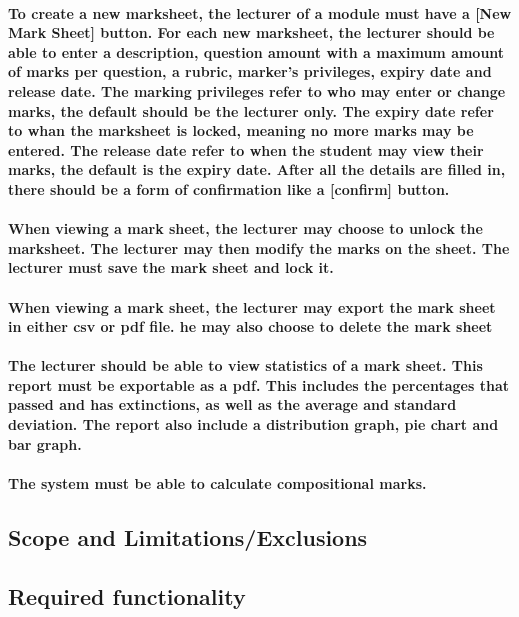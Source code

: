 \documentclass[12pt]{article}
\begin{document}
  \paragraph*{To create a new marksheet, the lecturer of a module must have a [New Mark Sheet] button. For each new marksheet, the lecturer should be able to enter a description, question amount with a maximum amount of marks per question, a rubric, marker's privileges, expiry date and release date. The marking privileges refer to who may enter or change marks, the default should be the lecturer only. The expiry date refer to whan the marksheet is locked, meaning no more marks may be entered. The release date refer to when the student may view their marks, the default is the expiry date. After all the details are filled in, there should be a form of confirmation like a [confirm] button.}
  \paragraph*{When viewing a mark sheet, the lecturer may choose to unlock the marksheet. The lecturer may then modify the marks on the sheet. The lecturer must save the mark sheet and lock it. }
  \paragraph*{When viewing a mark sheet, the lecturer may export the mark sheet in either csv or pdf file. he may also choose to delete the mark sheet}
  \paragraph*{The lecturer should be able to view statistics of a mark sheet.  This report must be exportable as a pdf. This includes the percentages that passed and has extinctions, as well as the average and standard deviation. The report also include a distribution graph, pie chart and bar graph.}
  \paragraph*{The system must be able to calculate compositional marks.}
  \subsection{Scope and Limitations/Exclusions}
  \subsection{Required functionality}
\end{document}
